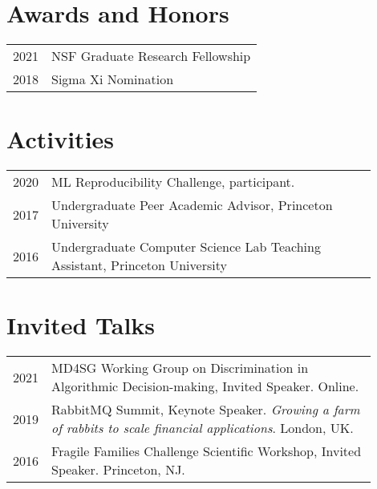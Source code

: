 \documentclass[margin]{res}
\begin{document}
\begin{resume}
\section{Awards  and Honors}
\begin{tabular}{l l}	
2021& NSF Graduate Research Fellowship\\
2018& Sigma Xi Nomination
\end{tabular}


\section{Activities}
\begin{tabular}{l p{0.9\linewidth}}	
2020& ML Reproducibility Challenge, participant.\\
2017& Undergraduate Peer Academic Advisor, Princeton University\\
2016& Undergraduate Computer Science Lab Teaching Assistant, Princeton University\\
\end{tabular}

\section{Invited Talks}
\begin{tabular}{l p{0.9\linewidth}}	
2021& MD4SG Working Group on Discrimination in Algorithmic Decision-making, Invited Speaker. Online.\\
2019& RabbitMQ Summit, Keynote Speaker. \textit{Growing a farm of rabbits to scale financial applications}. London, UK.\\
2016& Fragile Families Challenge Scientific Workshop, Invited Speaker. Princeton, NJ.\\
\end{tabular}


\end{resume}
\end{document}
